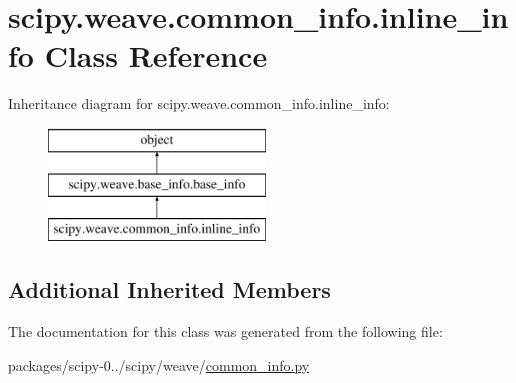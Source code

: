 \hypertarget{classscipy_1_1weave_1_1common__info_1_1inline__info}{}\section{scipy.\+weave.\+common\+\_\+info.\+inline\+\_\+info Class Reference}
\label{classscipy_1_1weave_1_1common__info_1_1inline__info}
Inheritance diagram for scipy.\+weave.\+common\+\_\+info.\+inline\+\_\+info\+:\begin{figure}[H]
\begin{center}
\leavevmode
\includegraphics[height=3.000000cm]{classscipy_1_1weave_1_1common__info_1_1inline__info}
\end{center}
\end{figure}
\subsection*{Additional Inherited Members}


The documentation for this class was generated from the following file\+:\begin{DoxyCompactItemize}
\item 
packages/scipy-\/0../scipy/weave/\hyperlink{common__info_8py}{common\+\_\+info.\+py}\end{DoxyCompactItemize}
